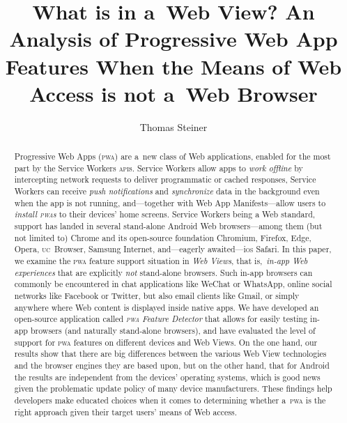 \documentclass[sigconf]{acmart}
\begin{document}
\title[What is in a~Web View?]{What is in a~Web View?
An Analysis of Progressive Web App Features
When the Means of Web Access is not a~Web Browser}  



\author{Thomas Steiner}



\begin{abstract}
Progressive Web Apps (\textsc{pwa}) are a~new class of Web applications,
enabled for the most part by the Service Workers \textsc{api}s.
Service Workers allow apps to \emph{work offline}
by intercepting network requests to deliver programmatic or cached responses,
Service Workers can receive \emph{push notifications}
and \emph{synchronize} data in the background
even when the app is not running,
and---together with Web App Manifests---allow users to \emph{install \textsc{pwa}s}
to their devices' home screens.
Service Workers being a Web standard, support has landed in several
stand-alone Android Web browsers---among them (but not limited to)
Chrome and its open-source foundation Chromium, Firefox, Edge, Opera,
\textsc{uc}~Browser, Samsung Internet, and---eagerly awaited---i\textsc{os} Safari.
In this paper, we examine the \textsc{pwa} feature support situation in \emph{Web Views},
that is,\ \emph{in-app Web experiences} that are explicitly \emph{not} stand-alone browsers.
Such in-app browsers can commonly be encountered in chat applications like WeChat or WhatsApp,
online social networks like Facebook or Twitter, but also email clients like Gmail,
or simply anywhere where Web content is displayed inside native apps.
We have developed an open-source application called \emph{\textsc{pwa} Feature Detector}
that allows for easily testing in-app browsers (and naturally stand-alone browsers),
and have evaluated the level of support for \textsc{pwa} features
on different devices and Web Views.
On the one hand, our results show that there are big differences
between the various Web View technologies
and the browser engines they are based upon,
but on the other hand, that for Android the results
are independent from the devices' operating systems,
which is good news given the problematic update policy of many device manufacturers.
These findings help developers make educated choices when it comes to determining
whether a~\textsc{pwa} is the right approach given their target users' means of Web access.
\end{abstract}
\end{document}
